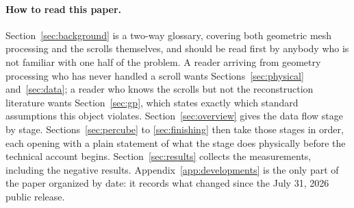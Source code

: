 \paragraph{How to read this paper.} Section~\ref{sec:background} is a two-way glossary, covering both geometric mesh processing and the scrolls themselves, and should be read first by anybody who is not familiar with one half of the problem. A reader arriving from geometry processing who has never handled a scroll wants Sections~\ref{sec:physical} and~\ref{sec:data}; a reader who knows the scrolls but not the reconstruction literature wants Section~\ref{sec:gp}, which states exactly which standard assumptions this object violates. Section~\ref{sec:overview} gives the data flow stage by stage. Sections~\ref{sec:percube} to \ref{sec:finishing} then take those stages in order, each opening with a plain statement of what the stage does physically before the technical account begins. Section~\ref{sec:results} collects the measurements, including the negative results. Appendix~\ref{app:developments} is the only part of the paper organized by date: it records what changed since the July 31, 2026 public release.

